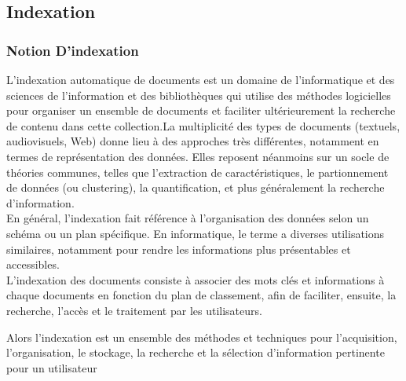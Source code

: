 \documentclass[12pt]{report}
\begin{document}
\subsection{Indexation}
\subsubsection{Notion D'indexation}
L'indexation automatique de documents est un domaine de l'informatique et des sciences de l'information et des bibliothèques qui utilise des méthodes logicielles pour organiser un ensemble de documents et faciliter ultérieurement la recherche de contenu dans cette collection.La multiplicité des types de documents (textuels, audiovisuels, Web) donne lieu à des approches très différentes, notamment en termes de représentation des données. Elles reposent néanmoins sur un socle de théories communes, telles que l'extraction de caractéristiques, le partionnement de données (ou clustering), la quantification, et plus généralement la recherche d'information\cite{43}.\\
En général, l'indexation fait référence à l'organisation des données selon un schéma ou un plan spécifique. En informatique, le terme a diverses utilisations similaires, notamment pour rendre les informations plus présentables et accessibles\cite{44}.\\

L'indexation des documents consiste à associer des mots clés et informations à chaque documents en fonction du plan de classement, afin de faciliter, ensuite, la recherche, l’accès et le traitement par les utilisateurs.

Alors l’indexation est un ensemble des méthodes et techniques pour l’acquisition, l’organisation, le stockage, la recherche et la sélection d’information pertinente pour un utilisateur
\end{document}
